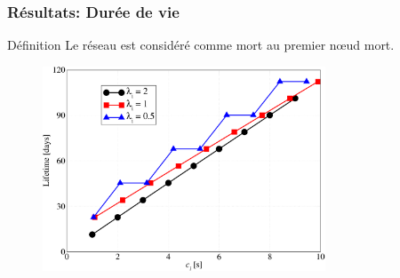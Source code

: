 \begin{frame}\frametitle{Résultats: Durée de vie}

  \begin{block}{Définition}
    Le réseau est considéré comme mort au premier nœud mort.
  \end{block}

  \begin{figure}[ht]
    \centering
    \includegraphics[width=0.75\textwidth]{figures/lifetime.pdf}
  \end{figure}


\end{frame}

